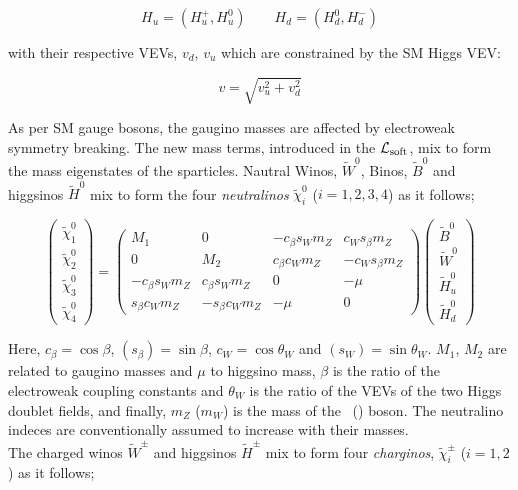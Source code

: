 				\begin{equation*}
					H_u = (H_u^+, H_u^0) \qquad H_d = (H_d^0, H_d^-) 
					\label{eq:MSSM_HiggsDoublets}
				\end{equation*}

				\noindent with their respective VEVs, $v_d$, $v_u$ which are constrained by the SM Higgs VEV: 

				\begin{equation*}
					v = \sqrt{v_u^2 + v_d^2}
					\label{eq:MSSM_HiggsVEVs}
				\end{equation*}

				
				As per SM gauge bosons, the gaugino masses are affected by electroweak symmetry breaking. The new mass terms, introduced in the $\cal L_{\mathrm{soft}}$, mix to form the mass eigenstates of the sparticles. Nautral Winos, $\tilde{W}^0$, Binos, $\tilde{B}^0$ and higgsinos $\tilde{H}^0$ mix to form the four \textit{neutralinos} $\tilde{\chi}^0_i$ ($i=1,2,3,4$)  as it follows; 

				\begin{equation}
				\label{eq:neutralino_mixing}
						\begin{pmatrix}  \tilde{\chi}^{0}_1 \\ \tilde{\chi}^{0}_2 \\ \tilde{\chi}^{0}_3 \\ \tilde{\chi}^{0}_4 \end{pmatrix}	
						= 
						\begin{pmatrix}
							M_1 & 0 & - c_\beta s_W m_Z &  c_W s_\beta m_Z  \\
							0 & M_2 & c_\beta c_W m_Z  &  - c_W s_\beta m_Z \\
							- c_\beta s_W m_Z  & c_\beta s_W m_Z  & 0 & - \mu \\ 
							s_\beta c_W m_Z  & - s_\beta c_W m_Z & - \mu & 0  
						\end{pmatrix}
						\begin{pmatrix}
							\tilde{B}^{0} \\
							\tilde{W}^{0} \\
							\tilde{H}^{0}_u \\
							\tilde{H}^{0}_d
						\end{pmatrix}
				\end{equation}

				\noindent Here, $c_{\beta} = \cos \beta$,  $(s_{\beta}) = \sin \beta$, $c_W = \cos \theta_W$ and $(s_W) = \sin \theta_W$. $M_1$, $M_2$ are related to gaugino masses and $\mu$ to higgsino mass, $\beta$ is the ratio of the electroweak coupling constants and $\theta_W$ is the ratio of the VEVs of the two Higgs doublet fields, and finally, $m_Z$ ($m_W$) is the mass of the \Zboson\ (\Wboson) boson. The neutralino indeces are conventionally assumed to increase with their masses. 
				\\The charged winos $\tilde{W}^{\pm}$ and higgsinos $\tilde{H}^{\pm}$ mix to form four \textit{charginos}, $\tilde{\chi}^{\pm}_i$ ($i=1,2$) as it follows;

